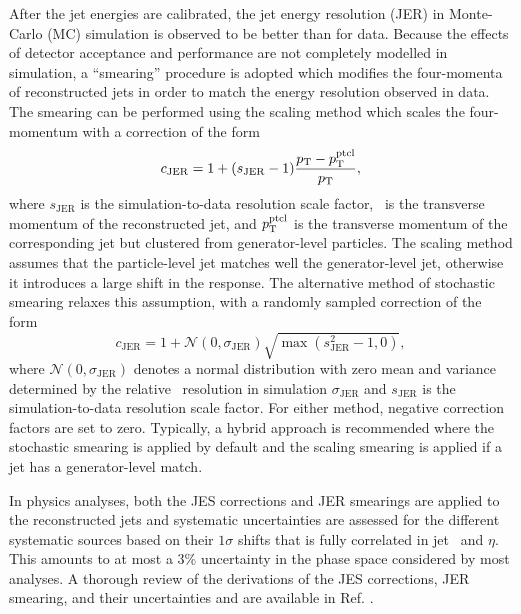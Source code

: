 After the jet energies are calibrated, the jet energy resolution (JER) in Monte-Carlo (MC) simulation is observed to be better than for data. Because the effects of detector acceptance and performance are not completely modelled in simulation, a ``smearing'' procedure is adopted which modifies the four-momenta of reconstructed jets in order to match the energy resolution observed in data. The smearing can be performed using the scaling method which scales the four-momentum with a correction of the form
\begin{equation}
  c_{\mathrm{JER}} = 1 + (s_{\mathrm{JER}} - 1) \frac{\pT - \pT^{\mathrm{ptcl}}}{\pT},
  \label{eq:smearing_scale}
\end{equation}
where $s_{\mathrm{JER}}$ is the simulation-to-data resolution scale factor, \pT\ is the transverse momentum of the reconstructed jet, and $p_{\mathrm{T}}^{\mathrm{ptcl}}$ is the transverse momentum of the corresponding jet but clustered from generator-level particles. The scaling method assumes that the particle-level jet matches well the generator-level jet, otherwise it introduces a large shift in the response. The alternative method of stochastic smearing relaxes this assumption, with a randomly sampled correction of the form
\begin{equation}
  c_{\mathrm{JER}} = 1 + \mathcal{N}\left( 0, \sigma_{\mathrm{JER}} \right) \sqrt{\max \left( s_{\mathrm{JER}}^{2} - 1, 0 \right)},
  \label{eq:smearing_stochastic}
\end{equation}
where $\mathcal{N}\left( 0, \sigma_{\mathrm{JER}} \right)$ denotes a normal distribution with zero mean and variance determined by the relative \pT\ resolution in simulation $\sigma_{\mathrm{JER}}$ and $s_{\mathrm{JER}}$ is the simulation-to-data resolution scale factor. For either method, negative correction factors are set to zero. Typically, a hybrid approach is recommended where the stochastic smearing is applied by default and the scaling smearing is applied if a jet has a generator-level match.

In physics analyses, both the JES corrections and JER smearings are applied to the reconstructed jets and systematic uncertainties are assessed for the different systematic sources based on their $1\sigma$ shifts that is fully correlated in jet \pT\ and $\eta$. This amounts to at most a 3\% uncertainty in the phase space considered by most analyses. A thorough review of the derivations of the JES corrections, JER smearing, and their uncertainties and are available in Ref. \cite{CMSJES}.

